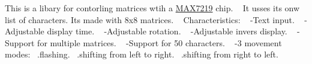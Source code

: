This is a libary for contorling matrices wtih a \hyperlink{class_m_a_x7219}{M\+A\+X7219} chip. ~\newline
It usses its onw list of characters. Its made with 8x8 matrices. ~\newline
Characteristics\+: ~\newline
-\/\+Text input. ~\newline
 -\/\+Adjustable display time. ~\newline
-\/\+Adjustable rotation. ~\newline
-\/\+Adjustable invers display. ~\newline
-\/\+Support for multiple matrices. ~\newline
-\/\+Support for 50 characters. ~\newline
-\/3 movement modes\+: ~.\+flashing. ~.\+shifting from left to right. ~.\+shifting from right to left. ~\newline
